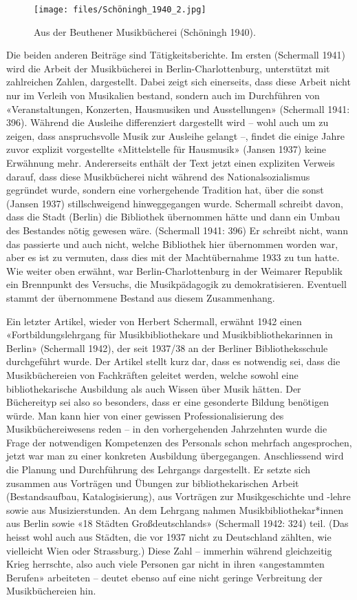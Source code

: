 \documentclass[a4paper,
fontsize=11pt,
oneside,
numbers=noperiodatend,
parskip=half-,
bibliography=totoc,
final
]{scrartcl}
\begin{document}
\begin{figure}
\centering
\texttt{[image: files/Schöningh\_1940\_2.jpg]}
\caption{Aus der Beuthener Musikbücherei (Schöningh 1940).}
\end{figure}

Die beiden anderen Beiträge sind Tätigkeitsberichte. Im ersten
(Schermall 1941) wird die Arbeit der Musikbücherei in
Berlin-Charlottenburg, unterstützt mit zahlreichen Zahlen, dargestellt.
Dabei zeigt sich einerseits, dass diese Arbeit nicht nur im Verleih von
Musikalien bestand, sondern auch im Durchführen von «Veranstaltungen,
Konzerten, Hausmusiken und Ausstellungen» (Schermall 1941: 396). Während
die Ausleihe differenziert dargestellt wird -- wohl auch um zu zeigen,
dass anspruchsvolle Musik zur Ausleihe gelangt --, findet die einige
Jahre zuvor explizit vorgestellte «Mittelstelle für Hausmusik» (Jansen
1937) keine Erwähnung mehr. Andererseits enthält der Text jetzt einen
expliziten Verweis darauf, dass diese Musikbücherei nicht während des
Nationalsozialismus gegründet wurde, sondern eine vorhergehende
Tradition hat, über die sonst (Jansen 1937) stillschweigend
hinweggegangen wurde. Schermall schreibt davon, dass die Stadt (Berlin)
die Bibliothek übernommen hätte und dann ein Umbau des Bestandes nötig
gewesen wäre. (Schermall 1941: 396) Er schreibt nicht, wann das
passierte und auch nicht, welche Bibliothek hier übernommen worden war,
aber es ist zu vermuten, dass dies mit der Machtübernahme 1933 zu tun
hatte. Wie weiter oben erwähnt, war Berlin-Charlottenburg in der
Weimarer Republik ein Brennpunkt des Versuchs, die Musikpädagogik zu
demokratisieren. Eventuell stammt der übernommene Bestand aus diesem
Zusammenhang.

Ein letzter Artikel, wieder von Herbert Schermall, erwähnt 1942 einen
«Fortbildungslehrgang für Musikbibliothekare und Musikbibliothekarinnen
in Berlin» (Schermall 1942), der seit 1937/38 an der Berliner
Bibliotheksschule durchgeführt wurde. Der Artikel stellt kurz dar, dass
es notwendig sei, dass die Musikbüchereien von Fachkräften geleitet
werden, welche sowohl eine bibliothekarische Ausbildung als auch Wissen
über Musik hätten. Der Büchereityp sei also so besonders, dass er eine
gesonderte Bildung benötigen würde. Man kann hier von einer gewissen
Professionalisierung des Musikbüchereiwesens reden -- in den
vorhergehenden Jahrzehnten wurde die Frage der notwendigen Kompetenzen
des Personals schon mehrfach angesprochen, jetzt war man zu einer
konkreten Ausbildung übergegangen. Anschliessend wird die Planung und
Durchführung des Lehrgangs dargestellt. Er setzte sich zusammen aus
Vorträgen und Übungen zur bibliothekarischen Arbeit (Bestandsaufbau,
Katalogisierung), aus Vorträgen zur Musikgeschichte und -lehre sowie aus
Musizierstunden. An dem Lehrgang nahmen Musikbibliothekar*innen aus
Berlin sowie «18 Städten Großdeutschlands» (Schermall 1942: 324) teil.
(Das heisst wohl auch aus Städten, die vor 1937 nicht zu Deutschland
zählten, wie vielleicht Wien oder Strassburg.) Diese Zahl -- immerhin
während gleichzeitig Krieg herrschte, also auch viele Personen gar nicht
in ihren «angestammten Berufen» arbeiteten -- deutet ebenso auf eine
nicht geringe Verbreitung der Musikbüchereien hin.
\end{document}
